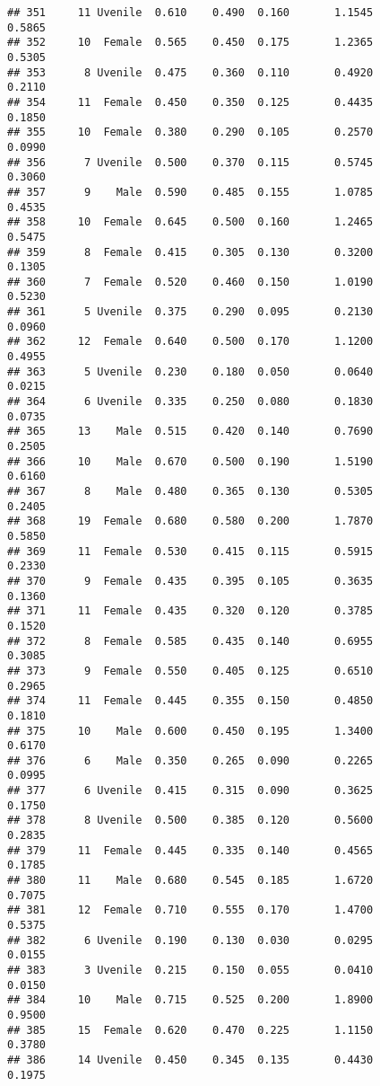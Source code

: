 \documentclass[
]{article}
\begin{document}
\begin{verbatim}
## 351     11 Uvenile  0.610    0.490  0.160       1.1545         0.5865
## 352     10  Female  0.565    0.450  0.175       1.2365         0.5305
## 353      8 Uvenile  0.475    0.360  0.110       0.4920         0.2110
## 354     11  Female  0.450    0.350  0.125       0.4435         0.1850
## 355     10  Female  0.380    0.290  0.105       0.2570         0.0990
## 356      7 Uvenile  0.500    0.370  0.115       0.5745         0.3060
## 357      9    Male  0.590    0.485  0.155       1.0785         0.4535
## 358     10  Female  0.645    0.500  0.160       1.2465         0.5475
## 359      8  Female  0.415    0.305  0.130       0.3200         0.1305
## 360      7  Female  0.520    0.460  0.150       1.0190         0.5230
## 361      5 Uvenile  0.375    0.290  0.095       0.2130         0.0960
## 362     12  Female  0.640    0.500  0.170       1.1200         0.4955
## 363      5 Uvenile  0.230    0.180  0.050       0.0640         0.0215
## 364      6 Uvenile  0.335    0.250  0.080       0.1830         0.0735
## 365     13    Male  0.515    0.420  0.140       0.7690         0.2505
## 366     10    Male  0.670    0.500  0.190       1.5190         0.6160
## 367      8    Male  0.480    0.365  0.130       0.5305         0.2405
## 368     19  Female  0.680    0.580  0.200       1.7870         0.5850
## 369     11  Female  0.530    0.415  0.115       0.5915         0.2330
## 370      9  Female  0.435    0.395  0.105       0.3635         0.1360
## 371     11  Female  0.435    0.320  0.120       0.3785         0.1520
## 372      8  Female  0.585    0.435  0.140       0.6955         0.3085
## 373      9  Female  0.550    0.405  0.125       0.6510         0.2965
## 374     11  Female  0.445    0.355  0.150       0.4850         0.1810
## 375     10    Male  0.600    0.450  0.195       1.3400         0.6170
## 376      6    Male  0.350    0.265  0.090       0.2265         0.0995
## 377      6 Uvenile  0.415    0.315  0.090       0.3625         0.1750
## 378      8 Uvenile  0.500    0.385  0.120       0.5600         0.2835
## 379     11  Female  0.445    0.335  0.140       0.4565         0.1785
## 380     11    Male  0.680    0.545  0.185       1.6720         0.7075
## 381     12  Female  0.710    0.555  0.170       1.4700         0.5375
## 382      6 Uvenile  0.190    0.130  0.030       0.0295         0.0155
## 383      3 Uvenile  0.215    0.150  0.055       0.0410         0.0150
## 384     10    Male  0.715    0.525  0.200       1.8900         0.9500
## 385     15  Female  0.620    0.470  0.225       1.1150         0.3780
## 386     14 Uvenile  0.450    0.345  0.135       0.4430         0.1975

\end{verbatim}
\end{document}
